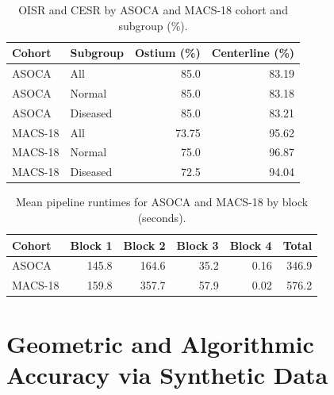 \vspace{-0.75em}
\begin{table}[H]
  \caption{OISR and CESR by ASOCA and MACS-18 cohort and subgroup (\%).}
  \label{tab:ostium-centerline-comparison}
  \vspace{0.5em}
  \centering
  \small
  \renewcommand{\arraystretch}{1.35}
  \setlength{\tabcolsep}{6pt}
  \begin{tabular}{@{}llrr@{}}
    \toprule
    \cellcolor{gray!12}\textbf{Cohort} &
    \cellcolor{gray!12}\textbf{Subgroup} &
    \cellcolor{gray!12}\textbf{Ostium (\%)} &
    \cellcolor{gray!12}\textbf{Centerline (\%)} \\
    \midrule
    ASOCA & All & 85.0 & 83.19 \\
    ASOCA & Normal & 85.0 & 83.18 \\
    ASOCA & Diseased & 85.0 & 83.21 \\
    MACS-18 & All & 73.75 & 95.62 \\
    MACS-18 & Normal & 75.0 & 96.87 \\
    MACS-18 & Diseased & 72.5 & 94.04 \\
    \bottomrule
  \end{tabular}
\end{table}

\vspace{-0.75em}
\begin{table}[H]
  \caption{Mean pipeline runtimes for ASOCA and MACS-18 by block (seconds).}
  \label{tab:runtime-comparison}
  \vspace{0.5em}
  \centering
  \small
  \renewcommand{\arraystretch}{1.35}
  \setlength{\tabcolsep}{6pt}
  \begin{tabular}{@{}lrrrrr@{}}
    \toprule
    \cellcolor{gray!12}\textbf{Cohort} &
    \cellcolor{gray!12}\textbf{Block 1} &
    \cellcolor{gray!12}\textbf{Block 2} &
    \cellcolor{gray!12}\textbf{Block 3} &
    \cellcolor{gray!12}\textbf{Block 4} &
    \cellcolor{gray!12}\textbf{Total} \\
    \midrule
    ASOCA & 145.8 & 164.6 & 35.2 & 0.16 & 346.9 \\
    MACS-18 & 159.8 & 357.7 & 57.9 & 0.02 & 576.2 \\
    \bottomrule
  \end{tabular}
\end{table}

\section{Geometric and Algorithmic Accuracy via Synthetic Data}
\label{sec:results-synthetic}

